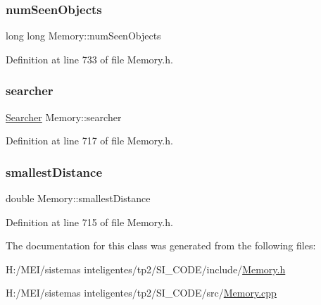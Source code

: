 \subsubsection{\texorpdfstring{num\+Seen\+Objects}{numSeenObjects}}
{\footnotesize\ttfamily long long Memory\+::num\+Seen\+Objects\hspace{0.3cm}{\ttfamily [protected]}}



Definition at line 733 of file Memory.\+h.

\mbox{\label{class_memory_a28d1cf97ef560d4f096a506ef53a1410}} 
\subsubsection{\texorpdfstring{searcher}{searcher}}
{\footnotesize\ttfamily \hyperlink{class_searcher}{Searcher} Memory\+::searcher\hspace{0.3cm}{\ttfamily [protected]}}



Definition at line 717 of file Memory.\+h.

\mbox{\label{class_memory_a4b73ac8b78b6a1003e946f61697fe65d}} 
\subsubsection{\texorpdfstring{smallest\+Distance}{smallestDistance}}
{\footnotesize\ttfamily double Memory\+::smallest\+Distance\hspace{0.3cm}{\ttfamily [protected]}}



Definition at line 715 of file Memory.\+h.



The documentation for this class was generated from the following files\+:\begin{DoxyCompactItemize}
\item 
H\+:/\+M\+E\+I/sistemas inteligentes/tp2/\+S\+I\+\_\+\+C\+O\+D\+E/include/\hyperlink{_memory_8h}{Memory.\+h}\item 
H\+:/\+M\+E\+I/sistemas inteligentes/tp2/\+S\+I\+\_\+\+C\+O\+D\+E/src/\hyperlink{_memory_8cpp}{Memory.\+cpp}\end{DoxyCompactItemize}
